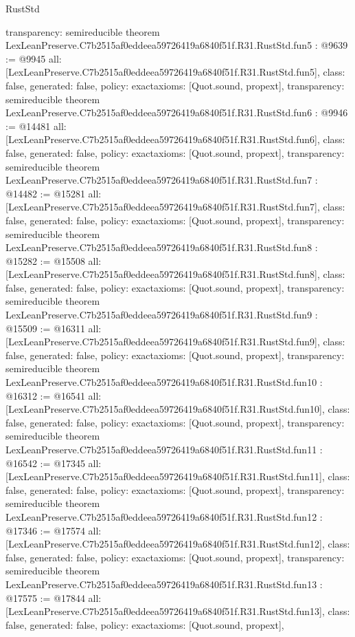 \begin{lexlean}{RustStd}
\begin{coremodule}
{  transparency: semireducible
}
theorem LexLeanPreserve.C7b2515af0eddeea59726419a6840f51f.R31.RustStd.fun5 : @9639 := @9945 {
  all: [LexLeanPreserve.C7b2515af0eddeea59726419a6840f51f.R31.RustStd.fun5],
  class: false,
  generated: false,
  policy: exact{axioms: [Quot.sound, propext]},
  transparency: semireducible
}
theorem LexLeanPreserve.C7b2515af0eddeea59726419a6840f51f.R31.RustStd.fun6 : @9946 := @14481 {
  all: [LexLeanPreserve.C7b2515af0eddeea59726419a6840f51f.R31.RustStd.fun6],
  class: false,
  generated: false,
  policy: exact{axioms: [Quot.sound, propext]},
  transparency: semireducible
}
theorem LexLeanPreserve.C7b2515af0eddeea59726419a6840f51f.R31.RustStd.fun7 : @14482 := @15281 {
  all: [LexLeanPreserve.C7b2515af0eddeea59726419a6840f51f.R31.RustStd.fun7],
  class: false,
  generated: false,
  policy: exact{axioms: [Quot.sound, propext]},
  transparency: semireducible
}
theorem LexLeanPreserve.C7b2515af0eddeea59726419a6840f51f.R31.RustStd.fun8 : @15282 := @15508 {
  all: [LexLeanPreserve.C7b2515af0eddeea59726419a6840f51f.R31.RustStd.fun8],
  class: false,
  generated: false,
  policy: exact{axioms: [Quot.sound, propext]},
  transparency: semireducible
}
theorem LexLeanPreserve.C7b2515af0eddeea59726419a6840f51f.R31.RustStd.fun9 : @15509 := @16311 {
  all: [LexLeanPreserve.C7b2515af0eddeea59726419a6840f51f.R31.RustStd.fun9],
  class: false,
  generated: false,
  policy: exact{axioms: [Quot.sound, propext]},
  transparency: semireducible
}
theorem LexLeanPreserve.C7b2515af0eddeea59726419a6840f51f.R31.RustStd.fun10 : @16312 := @16541 {
  all: [LexLeanPreserve.C7b2515af0eddeea59726419a6840f51f.R31.RustStd.fun10],
  class: false,
  generated: false,
  policy: exact{axioms: [Quot.sound, propext]},
  transparency: semireducible
}
theorem LexLeanPreserve.C7b2515af0eddeea59726419a6840f51f.R31.RustStd.fun11 : @16542 := @17345 {
  all: [LexLeanPreserve.C7b2515af0eddeea59726419a6840f51f.R31.RustStd.fun11],
  class: false,
  generated: false,
  policy: exact{axioms: [Quot.sound, propext]},
  transparency: semireducible
}
theorem LexLeanPreserve.C7b2515af0eddeea59726419a6840f51f.R31.RustStd.fun12 : @17346 := @17574 {
  all: [LexLeanPreserve.C7b2515af0eddeea59726419a6840f51f.R31.RustStd.fun12],
  class: false,
  generated: false,
  policy: exact{axioms: [Quot.sound, propext]},
  transparency: semireducible
}
theorem LexLeanPreserve.C7b2515af0eddeea59726419a6840f51f.R31.RustStd.fun13 : @17575 := @17844 {
  all: [LexLeanPreserve.C7b2515af0eddeea59726419a6840f51f.R31.RustStd.fun13],
  class: false,
  generated: false,
  policy: exact{axioms: [Quot.sound, propext]},
}
\end{coremodule}
\end{lexlean}
